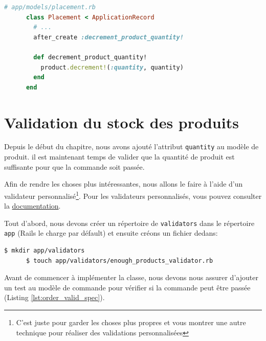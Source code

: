 \documentclass[]{report}
\begin{document}
    \begin{scriptsize}
      \begin{lstlisting}[language=ruby, caption={Implémentation de la mise à jour de la quantité des produits}, label={lst:placement_decrement_product_quantity}]
      # app/models/placement.rb
      class Placement < ApplicationRecord
        # ...
        after_create :decrement_product_quantity!

        def decrement_product_quantity!
          product.decrement!(:quantity, quantity)
        end
      end
      \end{lstlisting}
    \end{scriptsize}

  \section{Validation du stock des produits}

    Depuis le début du chapitre, nous avons ajouté l'attribut \verb|quantity| au modèle de produit. il est maintenant temps de valider que la quantité de produit est suffisante pour que la commande soit passée.

    Afin de rendre les choses plus intéressantes, nous allons le faire à l'aide d'un validateur personnalisé\footnote{C'est juste pour garder les choses plus propres et vous montrer une autre technique pour réaliser des validations personnalisées}. Pour les validateurs personnalisés, vous pouvez consulter la \href{https://guides.rubyonrails.org/active_record_validations.html#performing-custom-validations}{documentation}.

    Tout d'abord, nous devons créer un répertoire de \verb|validators| dans le répertoire \verb|app| (Rails le charge par défault) et ensuite créons un fichier dedans:

    \begin{scriptsize}
      \begin{lstlisting}[language=bash]
      $ mkdir app/validators
      $ touch app/validators/enough_products_validator.rb
      \end{lstlisting}
    \end{scriptsize}

    Avant de commencer à implémenter la classe, nous devons nous assurer d'ajouter un test au modèle de commande pour vérifier si la commande peut être passée (Listing \ref{lst:order_valid_spec}).
\end{document}
